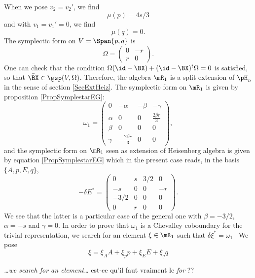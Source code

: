 When we pose $v_2=v_2'$, we find
\begin{equation}
\mu(p)=4s/3
\end{equation}
and with $v_1=v_1'=0$, we find
\begin{equation}
\mu(q)=0.
\end{equation}
The symplectic form on $V=\Span\{ p,q \}$ is 
\begin{equation}
 \Omega=\begin{pmatrix}
0&-r\\
r&0
\end{pmatrix}.
\end{equation}
One can check that the condition $\Omega(\id-\BX)+(\id-\BX)^{t}\Omega=0$ is satisfied, so that $\bar{\BX}\in\gsp(V,\Omega)$. Therefore, the algebra $\mR_{1}$ is a split extension of $\pH_{n}$ in the sense of section \ref{SecExtHeiz}. The symplectic form on $\mR_1$ is given by proposition \eqref{PropSymplestarEG}:
 \begin{equation}
\omega_{1}=\begin{pmatrix}
0	&-\alpha		&-\beta	&-\gamma\\
\alpha	&0			&0	&\frac{ 2\beta r }{ 3 }\\
\beta	&0			&0	&0\\
\gamma	&-\frac{ 2\beta r }{ 3 }	&0	&0
\end{pmatrix},
\end{equation}
and the symplectic form on $\mR_1$ seen as extension of Heisenberg algebra is given by equation \eqref{PropSymplestarEG} which in the present case reads, in the basis $\{ A,p,E,q \}$,
\begin{equation}
-\delta E^*=
\begin{pmatrix}
0&s&3/2&0\\
-s&0&0&-r\\
-3/2&0&0&0\\
0&r&0&0
\end{pmatrix}.
\end{equation}
We see that the latter is a particular case of the general one with $\beta=-3/2$, $\alpha=-s$ and $\gamma=0$. In order to prove that $\omega_{1}$ is a Chevalley coboundary for the trivial representation, we search for an element $\xi\in\mR_1$ such that $\delta\xi^*=\omega_{1}$%
\
 We pose
\[ 
  \xi=\xi_{A}A+\xi_{p}p+\xi_{E}E+\xi_{q}q
\]

\begin{probleme}
\emph{\ldots we search for an element\ldots} est-ce qu'il faut vraiment le \emph{for} ??
\end{probleme}

